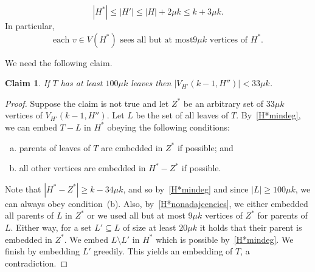 \documentclass[12pt]{article}
\newtheorem{claim}[theorem]{Claim}
\begin{document}
    
         \begin{equation}\label{H*size}
       |H^*|\le  |H'|\le |H|+2\mu k\le k+3\mu k.
        \end{equation}
        In particular,
        \begin{equation}\label{H*nonadajcencies}
       \text{each  $v\in V(H^*)$ sees all but at most
$9\mu k$  vertices of $H^*$.}
  \end{equation}
  
We need the following claim.

\begin{claim}
\label{Aug14claim1} If $T$ has at least $100\mu k$ leaves then $|V_{H'}(k-1,H'')| < 33\mu k$.
\end{claim}

\begin{proof}
    Suppose the claim is not true and let $Z^*$ be an arbitrary set of $33\mu k$ vertices of $V_{H'}(k-1, H'')$.
       Let $L$ be the set of all leaves of  $T$.   By~\eqref{H*mindeg}, we can embed   $T-L$ in $H^*$ obeying the following  conditions: 
       
  \begin{enumerate}[(a)]
  \item parents of leaves of $T$ are embedded in $Z^*$ if possible; and
  \item all other vertices are embedded in $H^*-Z^*$ if possible.
  \end{enumerate}
  Note that $|H^*-Z^*|\ge k-34\mu k$, and so by~\eqref{H*mindeg} and since $|L|\ge 100\mu k$, we can always obey condition~(b). Also, by~\eqref{H*nonadajcencies}, we either embedded all parents of $L$ in $Z^*$ or we used all but at most $9\mu k$ vertices of $Z^*$ for parents of $L$. Either way, for  a set $L'\subseteq L$ of size at least $20\mu k$ it holds that  their parent is embedded in $Z^*$. 
  We embed $L\setminus L'$ in $H^*$ which is possible by~\eqref{H*mindeg}. We finish by embedding $L'$ greedily. This yields an embedding of $T$, a contradiction.
\end{proof}
\iffalse
\end{document}
